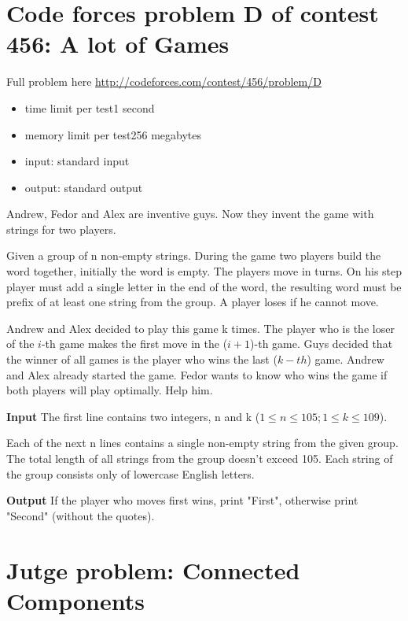 \documentclass[a4paper,10pt,table,xcdraw]{article}
\begin{document}
\begin{appendices}

\section{Code forces problem D of contest 456: A lot of Games }
\label{app:codeforces}

Full problem here \url{http://codeforces.com/contest/456/problem/D}
\begin{itemize}
\item[] time limit per test1 second
\item[] memory limit per test256 megabytes
\item[] input: standard input
\item[] output: standard output
\end{itemize}

Andrew, Fedor and Alex are inventive guys. Now they invent the game with strings for two players.

Given a group of n non-empty strings. During the game two players build the word together, initially the word is empty. The players move in turns. On his step player must add a single letter in the end of the word, the resulting word must be prefix of at least one string from the group. A player loses if he cannot move.

Andrew and Alex decided to play this game k times. The player who is the loser of the $i$-th game makes the first move in the ($i+1$)-th game. Guys decided that the winner of all games is the player who wins the last ($k-th$) game. Andrew and Alex already started the game. Fedor wants to know who wins the game if both players will play optimally. Help him.

\textbf{Input}
The first line contains two integers, n and k ($ 1 \leq n \leq 105; 1 \leq k \leq 109 $).

Each of the next n lines contains a single non-empty string from the given group. The total length of all strings from the group doesn't exceed 105. Each string of the group consists only of lowercase English letters.

\textbf{Output}
If the player who moves first wins, print "First", otherwise print "Second" (without the quotes).

\section{Jutge problem: Connected Components }
\label{app:jutge}


\end{appendices}
\end{document}
